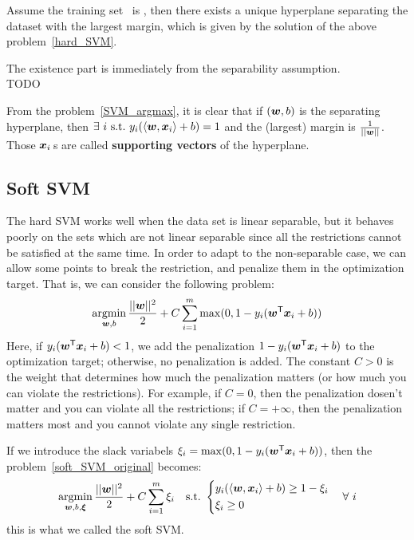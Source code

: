 \begin{thm}
    Assume the training set \dataset\ is , then there exists a unique hyperplane separating
    the dataset with the largest margin, which is given by the solution of the above 
    problem~\eqref{hard_SVM}.
\end{thm}
\begin{pf}
    The existence part is immediately from the separability assumption.\\
    TODO
\end{pf}

\begin{re}
    From the problem~\eqref{SVM_argmax}, it is clear that if $(\boldsymbol{w}, b)$ is the separating hyperplane, then
    $\exists~i\ \text{s.t.\ } y_i(\langle\boldsymbol{w}, \boldsymbol{x}_i\rangle + b) = 1$ and the (largest) margin is $\frac{1}{||\boldsymbol{w}||}$.
    Those $\boldsymbol{x}_i$\,s are called \textbf{supporting vectors} of the hyperplane.
\end{re}

\subsection{Soft SVM}
The hard SVM works well when the data set is linear separable, but it behaves poorly on the sets which are not
linear separable since all the restrictions cannot be satisfied at the same time. In order to adapt to the 
non-separable case, we can allow some points to break the restriction, and penalize them in the optimization
target. That is, we can consider the following problem:
\begin{equation}\label{soft_SVM_original}
    \operatorname*{argmin}_{\boldsymbol{w}, b} \frac{||\boldsymbol{w}||^2}{2} + C\sum_{i=1}^{m}\max(0, 1 - y_i({\boldsymbol{w}}^\mathsf{T}\boldsymbol{x}_i +b))
\end{equation}
Here, if $y_i({\boldsymbol{w}}^\mathsf{T}\boldsymbol{x}_i +b) < 1$, we add the penalization $1 - y_i({\boldsymbol{w}}^\mathsf{T}\boldsymbol{x}_i +b)$ to the 
optimization target; otherwise, no penalization is added. The constant $C > 0$ is the weight that determines 
how much the penalization matters (or how much you can violate the restrictions). For example, if $C = 0$, 
then the penalization dosen't matter and you can violate all the restrictions; if $C = +\infty$, then the 
penalization matters most and you cannot violate any single restriction.\par
If we introduce the slack variabels $\xi_i = \max(0, 1 - y_i({\boldsymbol{w}}^\mathsf{T}\boldsymbol{x}_i +b))$, then
the problem~\eqref{soft_SVM_original} becomes:
\begin{equation}\label{soft_SVM}
    \operatorname*{argmin}_{\boldsymbol{w}, b, \boldsymbol{\xi}} \frac{||\boldsymbol{w}||^2}{2} + C\sum_{i=1}^{m}\xi_i\quad\text{s.t.\ }\left\{
    \begin{aligned}
    & y_i(\langle\boldsymbol{w}, \boldsymbol{x}_i\rangle + b) \geq 1 - \xi_i\\
    & \xi_i \geq 0 
    \end{aligned}\right.
    \quad\forall~i
\end{equation}
this is what we called the soft SVM\@.


